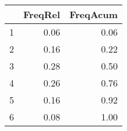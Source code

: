 \begin{table}[ht]
\centering
\begin{tabular}{rrr}
  \hline
 & FreqRel & FreqAcum \\ 
  \hline
1 & 0.06 & 0.06 \\ 
  2 & 0.16 & 0.22 \\ 
  3 & 0.28 & 0.50 \\ 
  4 & 0.26 & 0.76 \\ 
  5 & 0.16 & 0.92 \\ 
  6 & 0.08 & 1.00 \\ 
   \hline
\end{tabular}
\end{table}
